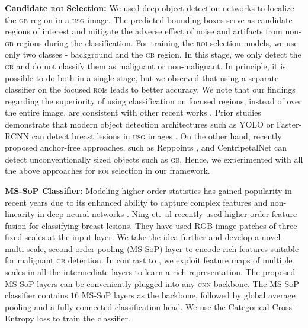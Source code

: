 \documentclass[10pt,twocolumn,letterpaper]{article}
\def\etal{{et.~al}}
\def\cnn{\textsc{cnn}\xspace}
\def\usg{\textsc{usg}\xspace}
\def\gb{\textsc{gb}\xspace}
\def\roi{\textsc{roi}\xspace}
\def\rois{\textsc{roi}s\xspace}
\newcommand{\myfirstpara}[1]{\noindent \textbf{#1:}}
\newcommand{\mypara}[1]{\vspace{0.1em} \myfirstpara{#1}}
\begin{document}
\mypara{Candidate \roi Selection}
We used deep object detection networks to localize the \gb region in a \usg image. The predicted bounding boxes serve as candidate regions of interest and mitigate the adverse effect of noise and artifacts from non-\gb regions during the classification. For training the \roi selection models, we use only two classes - background and the \gb region. In this stage, we only detect the \gb and do not classify them as malignant or non-malignant. In principle, it is possible to do both in a single stage, but we observed 
that using a separate classifier on the focused \rois leads to better accuracy. We note that our findings regarding the superiority of using classification on focused regions, instead of over the entire image, are consistent with other recent works \cite{sirinukunwattana2016locality, cao2019BreastLesion, lancet_pancreas, fan2020inf, eccv2020_devil_in_classification}. Prior studies demonstrate that modern object detection architectures such as YOLO \cite{yolov4} or Faster-RCNN \cite{fasterrcnn} can detect breast lesions in \usg images  \cite{cao2019BreastLesion}. On the other hand, recently proposed anchor-free approaches, such as Reppoints \cite{reppoints}, and CentripetalNet \cite{centripetalnet} can detect unconventionally sized objects such as \gb. Hence, we experimented with all the above approaches for \roi selection in our framework. 

\mypara{MS-SoP Classifier}
Modeling higher-order statistics has gained popularity in recent years due to its enhanced ability to capture complex features and non-linearity in deep neural networks \cite{zoumpourlis2017non, li2017second, gao2019global}. Ning \etal \cite{ning2020multi} recently used higher-order feature fusion for classifying breast lesions. They have used RGB image patches of three fixed scales at the input layer. We take the idea further and develop a novel multi-scale, second-order pooling (MS-SoP) layer to encode rich features suitable for malignant \gb detection. In contrast to \cite{ning2020multi}, we exploit feature maps of multiple scales in all the intermediate layers to learn a rich representation. The proposed MS-SoP layers can be conveniently plugged into any \cnn backbone.
The MS-SoP classifier contains $16$ MS-SoP layers as the backbone, followed by global average pooling and a fully connected classification head. 
We use the Categorical Cross-Entropy loss to train the classifier. 
\end{document}
